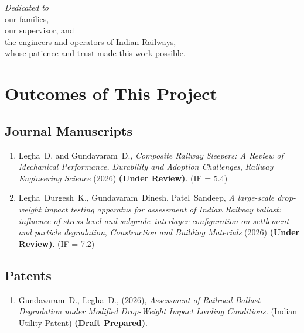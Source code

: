 
\cleardoublepage
\thispagestyle{empty}
\vspace*{4cm}
\begin{center}
{\Large\itshape\color{gsvblue} Dedicated to}\\[0.6cm]
{\large our families,}\\[0.2cm]
{\large our supervisor, and}\\[0.2cm]
{\large the engineers and operators of Indian Railways,}\\[0.6cm]
{\large whose patience and trust made this work possible.}
\end{center}
\vspace*{\fill}

\cleardoublepage
\chapter*{Outcomes of This Project}
\thispagestyle{plain}

\section*{\textcolor{gsvblue}{Journal Manuscripts}}
\begin{enumerate}[leftmargin=*,itemsep=4pt]
    \item Legha~D. and Gundavaram~D.,
          \emph{Composite Railway Sleepers: A Review of Mechanical
          Performance, Durability and Adoption Challenges},
          \textit{Railway Engineering Science} (2026)
          \textbf{(Under Review)}. (IF = 5.4)
    \item Legha~Durgesh~K., Gundavaram~Dinesh, Patel~Sandeep,
          \emph{A large-scale drop-weight impact testing apparatus for
          assessment of Indian Railway ballast: influence of stress level
          and subgrade--interlayer configuration on settlement and
          particle degradation},
          \textit{Construction and Building Materials} (2026)
          \textbf{(Under Review)}. (IF = 7.2)
\end{enumerate}

\section*{\textcolor{gsvblue}{Patents}}
\begin{enumerate}[leftmargin=*,itemsep=4pt]
    \item Gundavaram~D., Legha~D., (2026),
          \emph{Assessment of Railroad Ballast Degradation under Modified
          Drop-Weight Impact Loading Conditions.}
          (Indian Utility Patent) \textbf{(Draft Prepared)}.
\end{enumerate}

